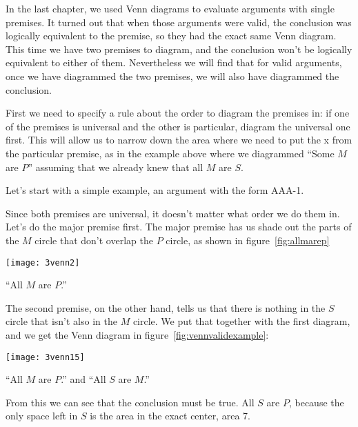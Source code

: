 In the last chapter, we used Venn diagrams to evaluate arguments with single premises. It turned out that when those arguments were valid, the conclusion was logically equivalent to the premise, so they had the exact same Venn diagram. This time we have two premises to diagram, and the conclusion won't be logically equivalent to either of them. Nevertheless we will find that for valid arguments, once we have diagrammed the two premises, we will also have diagrammed the conclusion.

First we need to specify a rule about the order to diagram the premises in: if one of the premises is universal and the other is particular, diagram the universal one first. This will allow us to narrow down the area where we need to put the x from the particular premise, as in the example above where we diagrammed ``Some $M$ are $P$'' assuming that we already knew that all $M$ are $S$.

Let's start with a simple example, an argument with the form AAA-1.

\begin{kormanize}
\end{kormanize}

Since both premises are universal, it doesn't matter what order we do them in. Let's do the major premise first. The major premise has us shade out the parts of the $M$ circle that don't overlap the $P$ circle, as shown in figure~\ref{fig:allmarep}

\begin{marginfigure}[-6cm]
\texttt{[image: 3venn2]}
\caption{``All $M$ are $P$.''}
\label{fig:allmarep}
\end{marginfigure}

The second premise, on the other hand, tells us that there is nothing in the $S$ circle that isn't also in the $M$ circle. We put that together with the first diagram, and we get the Venn diagram in figure~\ref{fig:vennvalidexample}:


\begin{marginfigure}[2cm]
\texttt{[image: 3venn15]}
\caption{``All $M$ are $P$.'' and ``All $S$ are $M$.''}
\label{fig:vennvalidexample}
\end{marginfigure}


From this we can see that the conclusion must be true. All $S$ are $P$, because the only space left in $S$ is the area in the exact center, area 7.

